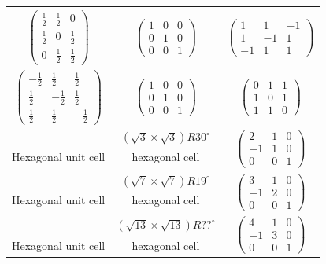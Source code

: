 \documentclass[11pt]{article}
\newcommand{\T}{\rule{0pt}{2.6ex}}
\newcommand{\TM}{\rule{0pt}{6ex}}
\newcommand{\BM}{\rule[-5ex]{0pt}{0pt}}
\begin{document}
\begin{table}[htdp]
\begin{center}
\begin{tabular}{c|c|c}
\TM $\begin{pmatrix}
\frac{1}{2} & \frac{1}{2} & 0 \\
\frac{1}{2} & 0 & \frac{1}{2} \\
0 & \frac{1}{2} & \frac{1}{2}
\end{pmatrix}$ &
$\begin{pmatrix}
1 & 0 & 0\\
0 & 1 & 0\\
0 & 0 & 1
\end{pmatrix}$ &
$\begin{pmatrix}
1 & 1 & -1\\
1 & -1 & 1\\
-1 & 1 & 1
\end{pmatrix}$\BM \\\hline
\TM $\begin{pmatrix}
-\frac{1}{2} & \frac{1}{2} & \frac{1}{2} \\
\frac{1}{2} & -\frac{1}{2} & \frac{1}{2} \\
\frac{1}{2} & \frac{1}{2} & -\frac{1}{2}
\end{pmatrix}$ &
$\begin{pmatrix}
1 & 0 & 0\\
0 & 1 & 0\\
0 & 0 & 1
\end{pmatrix}$ &
$\begin{pmatrix}
0 & 1 &  1\\
1 &  0 & 1\\
1 & 1 & 0
\end{pmatrix}$ \BM \\\hline
\T & $(\sqrt{3}\times\sqrt{3})R30^{\circ}$ & \multirow{3}{*}{$\begin{pmatrix} 2 &  1 & 0\\-1 & 1&  0\\ 0&0 &1 \end{pmatrix}$}\\
Hexagonal unit cell & hexagonal cell & \\
& & \\\hline
\T & $(\sqrt{7}\times\sqrt{7})R19^{\circ}$ & \multirow{3}{*}{$\begin{pmatrix} 3 &  1 & 0\\-1 & 2&  0\\ 0&0 &1 \end{pmatrix}$}\\
Hexagonal unit cell & hexagonal cell & \\
& & \\\hline
\T & $(\sqrt{13}\times\sqrt{13})R??^{\circ}$ & \multirow{3}{*}{$\begin{pmatrix} 4 &  1 & 0\\-1 & 3&  0\\ 0&0 &1 \end{pmatrix}$}\\
Hexagonal unit cell & hexagonal cell & 
\end{tabular}
\end{center}
\label{transformations}
\end{table}%

\end{document}
